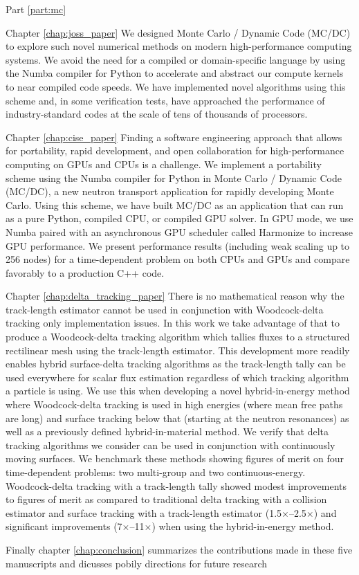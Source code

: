 Part \ref{part:mc}

Chapter \ref{chap:joss_paper}
We designed Monte Carlo / Dynamic Code (MC/DC) to explore such novel numerical methods on modern high-performance computing systems.
We avoid the need for a compiled or domain-specific language by using the Numba compiler for Python to accelerate and abstract our compute kernels to near compiled code speeds.
We have implemented novel algorithms using this scheme and, in some verification tests, have approached the performance of industry-standard codes at the scale of tens of thousands of processors.

Chapter \ref{chap:cise_paper} Finding a software engineering approach that allows for portability, rapid development, and open collaboration for high-performance computing on GPUs and CPUs is a challenge. 
We implement a portability scheme using the Numba compiler for Python in Monte Carlo / Dynamic Code (MC/DC), a new neutron transport application for rapidly developing Monte Carlo. 
Using this scheme, we have built MC/DC as an application that can run as a pure Python, compiled CPU, or compiled GPU solver. 
In GPU mode, we use Numba paired with an asynchronous GPU scheduler called Harmonize to increase GPU performance. We present performance results (including weak scaling up to 256 nodes) for a time-dependent problem on both CPUs and GPUs and compare favorably to a production C++ code.

Chapter \ref{chap:delta_tracking_paper} There is no mathematical reason why the track-length estimator cannot be used in conjunction with Woodcock-delta tracking only implementation issues. 
In this work we take advantage of that to produce a Woodcock-delta tracking algorithm which tallies fluxes to a structured rectilinear mesh using the track-length estimator.
This development more readily enables hybrid surface-delta tracking algorithms as the track-length tally can be used everywhere for scalar flux estimation regardless of which tracking algorithm a particle is using.
We use this when developing a novel hybrid-in-energy method where Woodcock-delta tracking is used in high energies (where mean free paths are long) and surface tracking below that (starting at the neutron resonances) as well as a previously defined hybrid-in-material method.
We verify that delta tracking algorithms we consider can be used in conjunction with continuously moving surfaces.
We benchmark these methods showing figures of merit on four time-dependent problems: two multi-group and two continuous-energy.
Woodcock-delta tracking with a track-length tally showed modest improvements to figures of merit as compared to traditional delta tracking with a collision estimator and surface tracking with a track-length estimator (\num{1.5}$\times$--\num{2.5}$\times$) and significant improvements (\num{7}$\times$--\num{11}$\times$) when using the hybrid-in-energy method.

Finally chapter \ref{chap:conclusion} summarizes the contributions made in these five manuscripts and dicusses pobily directions for future research

